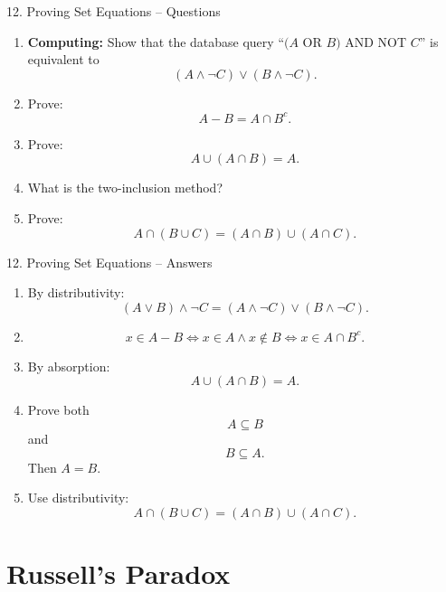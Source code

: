 \documentclass[aspectratio=169,11pt]{beamer}
\begin{document}
\begin{frame}{12. Proving Set Equations -- Questions}

\begin{enumerate}
\item \textbf{Computing:} Show that the database query
``$(A$ OR $B)$ AND NOT $C$'' is equivalent to
\[
(A\land\neg C)\lor(B\land\neg C).
\]

\item Prove:
\[
A-B=A\cap B^c.
\]

\item Prove:
\[
A\cup(A\cap B)=A.
\]

\item What is the two-inclusion method?

\item Prove:
\[
A\cap(B\cup C)
=(A\cap B)\cup(A\cap C).
\]
\end{enumerate}

\end{frame}

\begin{frame}{12. Proving Set Equations -- Answers}

\begin{enumerate}
\item By distributivity:
\[
(A\lor B)\land\neg C
=
(A\land\neg C)\lor(B\land\neg C).
\]

\item
\[
x\in A-B
\iff x\in A\land x\notin B
\iff x\in A\cap B^c.
\]

\item By absorption:
\[
A\cup(A\cap B)=A.
\]

\item Prove both
\[
A\subseteq B
\]
and
\[
B\subseteq A.
\]
Then $A=B$.

\item Use distributivity:
\[
A\cap(B\cup C)
=(A\cap B)\cup(A\cap C).
\]
\end{enumerate}

\end{frame}


\section{Russell's Paradox}
\end{document}
